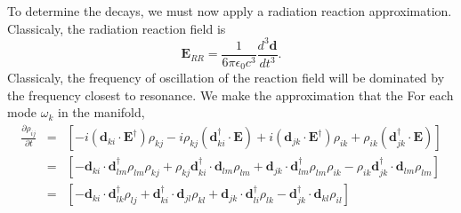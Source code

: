 \documentclass[final,5p,times,twocolumn]{elsarticle}
\begin{document}
To determine the decays, we must now apply a radiation reaction approximation.  Classicaly, the radiation reaction field is
\begin{equation}
	\mathbf{E}_{RR} = \frac{1}{6\pi\epsilon_0 c^3}\frac{d^3\mathbf{d}}{dt^3}.
\end{equation}
Classicaly, the frequency of oscillation of the reaction field will be dominated by the frequency closest to resonance.  We make the approximation that the 
For each mode $\omega_k$ in the manifold, 
	\begin{eqnarray}
		\frac{\partial \rho_{ij}}{\partial t} & = & \left[ -i (\mathbf{d}_{ki}\cdot \mathbf{E}^\dagger)\rho_{kj} - i\rho_{kj} (\mathbf{d}_{ki}^\dagger \cdot \mathbf{E}) + i (\mathbf{d}_{jk}\cdot \mathbf{E}^\dagger)\rho_{ik}  + \rho_{ik}(\mathbf{d}_{jk}^\dagger \cdot \mathbf{E})\right] \\
		& = & \left[
		-\mathbf{d}_{ki}\cdot \mathbf{d}^\dagger_{lm}\rho_{lm}\rho_{kj} 
		+\rho_{kj}\mathbf{d}_{ki}^\dagger \cdot \mathbf{d}_{lm}\rho_{lm}  
		+ \mathbf{d}_{jk}\cdot \mathbf{d}^\dagger_{lm}\rho_{lm}\rho_{ik}
		- \rho_{ik}\mathbf{d}_{jk}^\dagger \cdot \mathbf{d}_{lm}\rho_{lm}
		\right] \\
		& = & \left[
		-\mathbf{d}_{ki}\cdot \mathbf{d}^\dagger_{lk}\rho_{lj} 
		+ \mathbf{d}_{ki}^\dagger \cdot \mathbf{d}_{jl}\rho_{kl} 
		+ \mathbf{d}_{jk}\cdot \mathbf{d}^\dagger_{li}\rho_{lk}
		- \mathbf{d}_{jk}^\dagger \cdot \mathbf{d}_{kl}\rho_{il}
		\right]
	\end{eqnarray}
\end{document}
